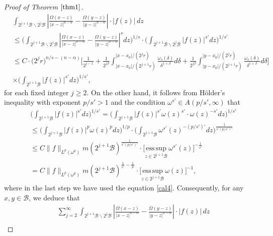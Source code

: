 \documentclass[preprint,10pt]{elsarticle}
\numberwithin{equation}{section}
\begin{document}
\begin{proof}[Proof of Theorem $\ref{thm1}$]
\begin{equation*}
\begin{split}
&\int_{2^{j+1}\mathcal{B}\backslash 2^j\mathcal{B}}
\left|\frac{\Omega(x-z)}{|x-z|^{n-\alpha}}-\frac{\Omega(y-z)}{|y-z|^{n-\alpha}}\right|\cdot|f(z)|\,dz\\
&\leq\bigg(\int_{2^{j+1}\mathcal{B}\backslash 2^j\mathcal{B}}
\left|\frac{\Omega(x-z)}{|x-z|^{n-\alpha}}-\frac{\Omega(y-z)}{|y-z|^{n-\alpha}}\right|^sdz\bigg)^{1/s}
\cdot\bigg(\int_{2^{j+1}\mathcal{B}\backslash 2^j\mathcal{B}}|f(z)|^{s'}dz\bigg)^{1/{s'}}\\
&\leq C\cdot\big(2^jr\big)^{n/s-(n-\alpha)}
\bigg[\frac{1}{2^{j-1}}+\frac{1}{2^{j\beta}}
\int_{|x-x_0|/{(2^{j+1}r)}}^{|x-x_0|/{(2^jr)}}\frac{\omega_s(\delta)}{\delta^{1+\beta}}d\delta
+\frac{1}{2^{j\beta}}
\int_{|y-x_0|/{(2^{j+1}r)}}^{|y-x_0|/{(2^jr)}}\frac{\omega_s(\delta)}{\delta^{1+\beta}}d\delta\bigg]\\
&\times\bigg(\int_{2^{j+1}\mathcal{B}}|f(z)|^{s'}dz\bigg)^{1/{s'}},
\end{split}
\end{equation*}
for each fixed integer $j\geq2$. On the other hand, it follows from H\"{o}lder's inequality with exponent $p/{s'}>1$ and the condition $\omega^{s'}\in A(p/{s'},\infty)$ that
\begin{equation*}
\begin{split}
&\bigg(\int_{2^{j+1}\mathcal{B}}|f(z)|^{s'}dz\bigg)^{1/{s'}}
=\bigg(\int_{2^{j+1}\mathcal{B}}|f(z)|^{s'}\omega(z)^{s'}\cdot \omega(z)^{-s'}dz\bigg)^{1/{s'}}\\
&\leq\bigg(\int_{2^{j+1}\mathcal{B}}|f(z)|^{p}\omega(z)^{p}dz\bigg)^{1/p}
\cdot\bigg(\int_{2^{j+1}\mathcal{B}}\omega^{s'}(z)^{-(p/{s'})'}dz\bigg)^{\frac{1}{s'(p/{s'})'}}\\
&\leq C\|f\|_{L^p(\omega^p)}m(2^{j+1}\mathcal{B})^{\frac{1}{s'(p/{s'})'}}
\cdot\Big[\underset{z\in 2^{j+1}\mathcal{B}}{\mathrm{ess\,sup}}\,\omega^{s'}(z)\Big]^{-\frac{1}{s'}}\\
&=C\|f\|_{L^p(\omega^p)}m(2^{j+1}\mathcal{B})^{\frac{1}{s'}-\frac{\,1\,}{p}}
\cdot\Big[\underset{z\in 2^{j+1}\mathcal{B}}{\mathrm{ess\,sup}}\,\omega(z)\Big]^{-1},
\end{split}
\end{equation*}
where in the last step we have used the equation \eqref{cal4}. Consequently, for any $x,y\in \mathcal{B}$, we deduce that
\begin{equation*}
\begin{split}
&\sum_{j=2}^\infty\int_{2^{j+1}\mathcal{B}\backslash 2^j\mathcal{B}}
\left|\frac{\Omega(x-z)}{|x-z|^{n-\alpha}}-\frac{\Omega(y-z)}{|y-z|^{n-\alpha}}\right|\cdot|f(z)|\,dz\\

\end{split}
\end{equation*}
\end{proof}
\end{document}
